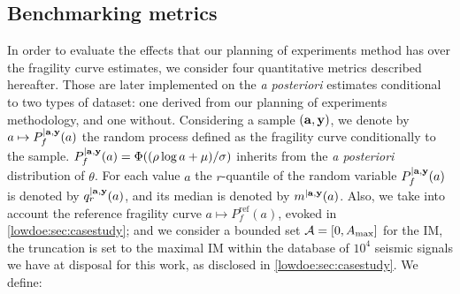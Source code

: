 \subsection{Benchmarking metrics}\label{lowdoe:sec:benchamrk}

In order to evaluate the effects that our planning of experiments method has over the fragility curve estimates, we consider four quantitative metrics described hereafter. Those are later implemented on the \emph{a posteriori} estimates conditional to two types of dataset: one derived from our planning of experiments methodology, and one without.
Considering a sample $(\mathbf{a}, \mathbf{y})$, we denote
by $a \mapsto P_f^{|\mathbf{a}, \mathbf{y}}(a)$ the random process defined as the fragility curve conditionally to the sample. $P_f^{|\mathbf{a},\mathbf{y}}(a)=\Phi((\rho\log a+\mu)/\sigma)$ inherits from the \emph{a posteriori} distribution of $\theta$.  
For each value $a$ the $r$-quantile of the random variable $P_f^{|\mathbf{a},\mathbf{y}}(a)$ is denoted by $q_r^{|\mathbf{a},\mathbf{y}}(a)$, and its median is denoted by $m^{|\mathbf{a},\mathbf{y}}(a)$.  
Also, we take into account the reference fragility curve $a\mapsto P_f^{\mathrm{ref}}(a)$, evoked in \cref{lowdoe:sec:casestudy}; and we consider a bounded set $\mathcal{A}=[0,A_{\max}]$ for the IM, the truncation is set to the maximal IM within the database of $10^4$ seismic signals we have at disposal for this work, as disclosed in \cref{lowdoe:sec:casestudy}. %
    We define:
